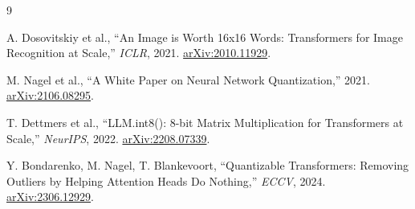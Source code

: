 \documentclass[12pt,a4paper]{article}
\begin{document}
\begin{thebibliography}{9}

A. Dosovitskiy et al.,
``An Image is Worth 16x16 Words: Transformers for Image Recognition at Scale,''
\emph{ICLR}, 2021. \href{https://arxiv.org/abs/2010.11929}{arXiv:2010.11929}.

M. Nagel et al.,
``A White Paper on Neural Network Quantization,''
2021. \href{https://arxiv.org/abs/2106.08295}{arXiv:2106.08295}.

T. Dettmers et al.,
``LLM.int8(): 8-bit Matrix Multiplication for Transformers at Scale,''
\emph{NeurIPS}, 2022. \href{https://arxiv.org/abs/2208.07339}{arXiv:2208.07339}.

Y. Bondarenko, M. Nagel, T. Blankevoort,
``Quantizable Transformers: Removing Outliers by Helping Attention Heads Do Nothing,''
\emph{ECCV}, 2024. \href{https://arxiv.org/abs/2306.12929}{arXiv:2306.12929}.

\end{thebibliography}
\end{document}
